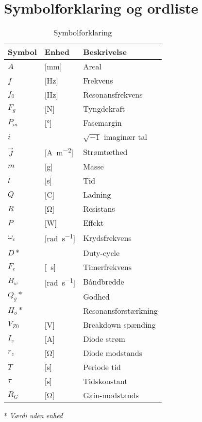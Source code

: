 \chapter{Symbolforklaring og ordliste} \label{bilag:symbol_ordliste}

\begin{table}[h!]
\centering
\caption{Symbolforklaring}
\label{tab:symboler}
\begin{threeparttable}
\begin{tabular}{l l l}
\toprule
\multicolumn{1}{l}{Symbol}       &
\multicolumn{1}{l}{Enhed}        &
\multicolumn{1}{l}{Beskrivelse}  \\ 
\midrule
$A$					&	[\si{\milli\meter}]			& Areal 		\\
$f$					&	[\si{\hertz}]				& Frekvens		\\
$f_0$				&	[\si{\hertz}] 				& Resonansfrekvens \\
$F_g$				&	[\si{\newton}]				& Tyngdekraft	\\
$P_{m}$				&	[\si{\degree}]				& Fasemargin	\\
$i$\tnote{*}		&								& $\sqrt{-1}$ imaginær tal	\\
$\vec{J}$			&	[\si{\ampere\per\meter\squared}]		& Strømtæthed	\\
$m$			  		&	[\si{\gram}] 				& Masse \\
$t$			  		&	[\si{\second}] 				& Tid \\
$Q$					&	[\si{\coulomb}] 			& Ladning \\
$R$					&	[\si{\ohm}] 				& Resistans \\
$P$					&	[\si{\watt}] 				& Effekt \\
$\omega_{c}$		&	[\si{\radian\per\second}]	& Krydsfrekvens	\\
$D*$				&								& Duty-cycle\\
$F_c$				&	[\si{\per\second}]			& Timerfrekvens\\
$B_w$				&	[\si{\radian\per\second}]	& Båndbredde\\
$Q_g*$				&								& Godhed\\
$H_o*$				&								& Resonansforstærkning\\
$V_{Z0}$			&	[\si{\volt}]				& Breakdown spænding\\
$I_z$				&	[\si{\ampere}]				& Diode strøm\\
$r_z$				&	[\si{\ohm}]					& Diode modstands\\
$T$					&	[\si{\second}]				& Periode tid\\
$\tau$				&	[\si{\second}]				& Tidskonstant\\
$R_G$				&	[\si{\ohm}]					& Gain-modstands\\

\bottomrule
\end{tabular}
\begin{tablenotes}
\item[*] \textit{Værdi uden enhed}
\end{tablenotes}
\end{threeparttable}
\end{table}


